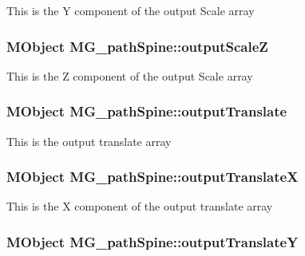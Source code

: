 This is the Y component of the output Scale array \hypertarget{class_m_g__path_spine_a6708ed79d1460a01cffc3171889e1637}{
\subsubsection[{output\-Scale\-Z}]{\setlength{\rightskip}{0pt plus 5cm}M\-Object M\-G\-\_\-path\-Spine\-::output\-Scale\-Z\hspace{0.3cm}{\ttfamily [static]}}}\label{class_m_g__path_spine_a6708ed79d1460a01cffc3171889e1637}
This is the Z component of the output Scale array \hypertarget{class_m_g__path_spine_a459813326a0970b67a4d94798a47aaba}{
\subsubsection[{output\-Translate}]{\setlength{\rightskip}{0pt plus 5cm}M\-Object M\-G\-\_\-path\-Spine\-::output\-Translate\hspace{0.3cm}{\ttfamily [static]}}}\label{class_m_g__path_spine_a459813326a0970b67a4d94798a47aaba}
This is the output translate array \hypertarget{class_m_g__path_spine_a8b4339da0fdb021a6b91d1449c99732a}{
\subsubsection[{output\-Translate\-X}]{\setlength{\rightskip}{0pt plus 5cm}M\-Object M\-G\-\_\-path\-Spine\-::output\-Translate\-X\hspace{0.3cm}{\ttfamily [static]}}}\label{class_m_g__path_spine_a8b4339da0fdb021a6b91d1449c99732a}
This is the X component of the output translate array \hypertarget{class_m_g__path_spine_ab4aca6c192a9818ab64096edf8aaea0d}{
\subsubsection[{output\-Translate\-Y}]{\setlength{\rightskip}{0pt plus 5cm}M\-Object M\-G\-\_\-path\-Spine\-::output\-Translate\-Y\hspace{0.3cm}{\ttfamily [static]}}}\label{class_m_g__path_spine_ab4aca6c192a9818ab64096edf8aaea0d}
